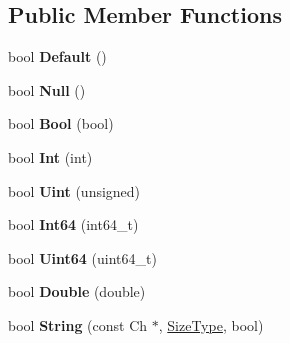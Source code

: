 \subsection*{Public Member Functions}
\begin{DoxyCompactItemize}
\item 
bool {\bfseries Default} ()\hypertarget{struct_base_reader_handler_a836437f6ccc37f08ff933f009b18a78c}{}\label{struct_base_reader_handler_a836437f6ccc37f08ff933f009b18a78c}

\item 
bool {\bfseries Null} ()\hypertarget{struct_base_reader_handler_ae2ebbde4628bf3659ddc5d18520935f5}{}\label{struct_base_reader_handler_ae2ebbde4628bf3659ddc5d18520935f5}

\item 
bool {\bfseries Bool} (bool)\hypertarget{struct_base_reader_handler_aa1c3ce42dbb856b3349792dc9d963587}{}\label{struct_base_reader_handler_aa1c3ce42dbb856b3349792dc9d963587}

\item 
bool {\bfseries Int} (int)\hypertarget{struct_base_reader_handler_a85e813aaf7189a2f87bd53953324fafc}{}\label{struct_base_reader_handler_a85e813aaf7189a2f87bd53953324fafc}

\item 
bool {\bfseries Uint} (unsigned)\hypertarget{struct_base_reader_handler_a0e683306cbb7b4e350a35c18c5246f2a}{}\label{struct_base_reader_handler_a0e683306cbb7b4e350a35c18c5246f2a}

\item 
bool {\bfseries Int64} (int64\+\_\+t)\hypertarget{struct_base_reader_handler_a04011733ea584739c97ad5c6afa15a35}{}\label{struct_base_reader_handler_a04011733ea584739c97ad5c6afa15a35}

\item 
bool {\bfseries Uint64} (uint64\+\_\+t)\hypertarget{struct_base_reader_handler_a351aa3cd81856a487c21022e9cc64d2b}{}\label{struct_base_reader_handler_a351aa3cd81856a487c21022e9cc64d2b}

\item 
bool {\bfseries Double} (double)\hypertarget{struct_base_reader_handler_a8156ea6ae5b8cd23a8b700e92a8af1eb}{}\label{struct_base_reader_handler_a8156ea6ae5b8cd23a8b700e92a8af1eb}

\item 
bool {\bfseries String} (const Ch $\ast$, \hyperlink{rapidjson_8h_a5ed6e6e67250fadbd041127e6386dcb5}{Size\+Type}, bool)\hypertarget{struct_base_reader_handler_a3ac69e6326d0aeef7b1f2619742bbe00}{}\label{struct_base_reader_handler_a3ac69e6326d0aeef7b1f2619742bbe00}


\end{DoxyCompactItemize}
